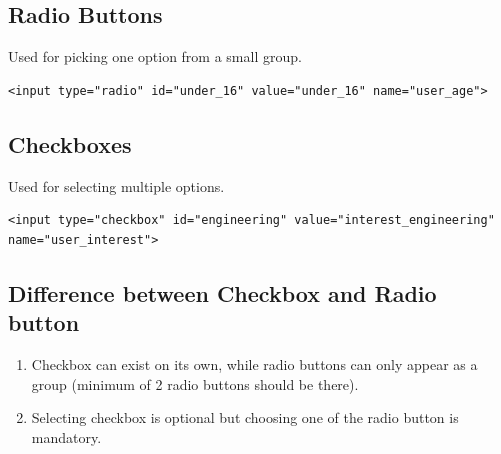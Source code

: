 \documentclass[12pt,a4paper]{article}
\begin{document}
\subsection*{Radio Buttons}
Used for picking one option from a small group.
\begin{verbatim}
<input type="radio" id="under_16" value="under_16" name="user_age">
\end{verbatim}

\subsection*{Checkboxes}
Used for selecting multiple options.
\begin{verbatim}
<input type="checkbox" id="engineering" value="interest_engineering" name="user_interest">
\end{verbatim}

\subsection*{Difference between Checkbox and Radio button}
\begin{enumerate}
    \item Checkbox can exist on its own, while radio buttons can only appear as a group (minimum of 2 radio buttons should be there).
    \item Selecting checkbox is optional but choosing one of the radio button is mandatory.
\end{enumerate}
\end{document}
